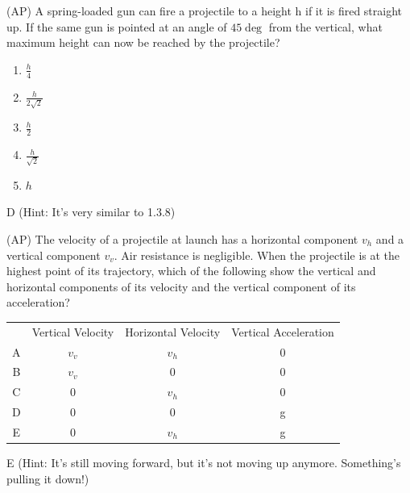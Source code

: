 \newpage
\begin{question}
(AP) A spring-loaded gun can fire a projectile to a height h if it is fired straight up. If the same gun is pointed at an angle of $45\deg$ from the vertical, what maximum height can now be reached by the projectile?
\begin{multicols}{5}
\begin{enumerate}[label=(\alph*)]
    \item $\frac{h}{4}$
    \item $\frac{h}{2\sqrt{2}}$
    \item $\frac{h}{2}$
    \item $\frac{h}{\sqrt{2}}$
    \item $h$
\end{enumerate}
\end{multicols}
\end{question}

\begin{solution}
D (Hint: It's very similar to 1.3.8)
\end{solution}


\begin{question}
(AP) The velocity of a projectile at launch has a horizontal component $v_h$ and a vertical component $v_v$. Air resistance is negligible. When the projectile is at the highest point of its trajectory, which of the following show the vertical and horizontal components of its velocity and the vertical component of its acceleration?

\begin{tabular}{ |c|c|c|c| } 
 \hline
       & Vertical Velocity & Horizontal Velocity & Vertical Acceleration \\ 
 A     & $v_v$ & $v_h$ & 0\\  
 B     & $v_v$ & 0 & 0\\ 
 C     & 0 & $v_h$ & 0\\ 
 D     & 0 & 0 & g\\ 
 E     & 0 & $v_h$ & g\\ 
 \hline
\end{tabular}

\end{question}

\begin{solution}
E (Hint: It's still moving forward, but it's not moving up anymore. Something's pulling it down!)
\end{solution}

